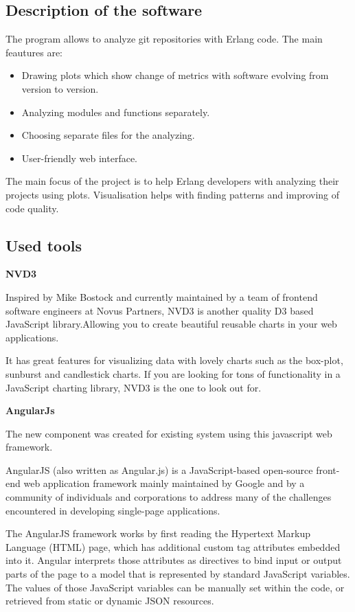 \subsection{Description of the software}

The program allows to analyze git repositories with Erlang code. The main feautures are:
\begin{itemize}
	\item Drawing plots which show change of metrics with software evolving from version to version.
	\item Analyzing modules and functions separately.
	\item Choosing separate files for the analyzing.
	\item User-friendly web interface.
\end{itemize}

The main focus of the project is to help Erlang developers with analyzing their projects using plots. Visualisation helps with finding patterns and improving of code quality. 

\subsection{Used tools}

\textbf{NVD3}

Inspired by Mike Bostock and currently maintained by a team of frontend software engineers at Novus Partners, NVD3 is another quality D3 based JavaScript library.Allowing you to create beautiful reusable charts in your web applications.

It has great features for visualizing data with lovely charts such as the box-plot, sunburst and candlestick charts. If you are looking for tons of functionality in a JavaScript charting library, NVD3 is the one to look out for.

\textbf{AngularJs}

The new component was created for existing system using this javascript web framework.

AngularJS (also written as Angular.js) is a JavaScript-based open-source front-end web application framework mainly maintained by Google and by a community of individuals and corporations to address many of the challenges encountered in developing single-page applications.

The AngularJS framework works by first reading the Hypertext Markup Language (HTML) page, which has additional custom tag attributes embedded into it. Angular interprets those attributes as directives to bind input or output parts of the page to a model that is represented by standard JavaScript variables. The values of those JavaScript variables can be manually set within the code, or retrieved from static or dynamic JSON resources. 

